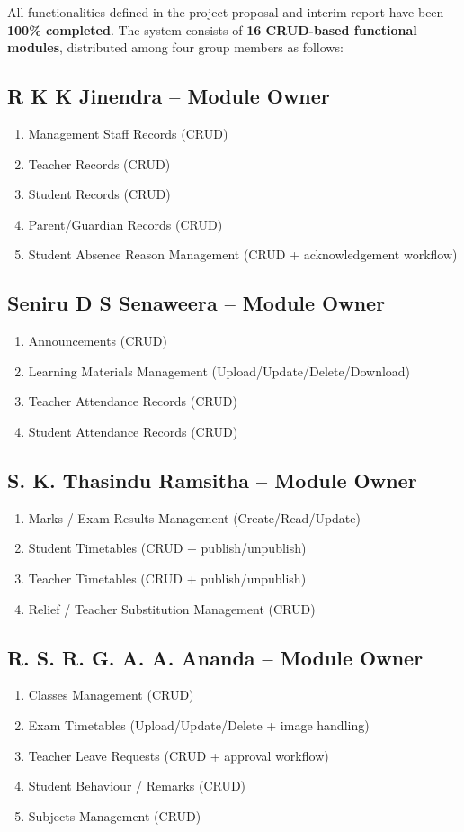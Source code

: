 \documentclass[12pt, a4paper]{report}
\begin{document}
All functionalities defined in the project proposal and interim report have been \textbf{100\% completed}. The system consists of \textbf{16 CRUD-based functional modules}, distributed among four group members as follows:

\subsection{R K K Jinendra -- Module Owner}
\begin{enumerate}
    \item Management Staff Records (CRUD)
    \item Teacher Records (CRUD)
    \item Student Records (CRUD)
    \item Parent/Guardian Records (CRUD)
    \item Student Absence Reason Management (CRUD + acknowledgement workflow)
\end{enumerate}

\subsection{Seniru D S Senaweera -- Module Owner}
\begin{enumerate}
    \item Announcements (CRUD)
    \item Learning Materials Management (Upload/Update/Delete/Download)
    \item Teacher Attendance Records (CRUD)
    \item Student Attendance Records (CRUD)
\end{enumerate}

\subsection{S. K. Thasindu Ramsitha -- Module Owner}
\begin{enumerate}
    \item Marks / Exam Results Management (Create/Read/Update)
    \item Student Timetables (CRUD + publish/unpublish)
    \item Teacher Timetables (CRUD + publish/unpublish)
    \item Relief / Teacher Substitution Management (CRUD)
\end{enumerate}

\subsection{R. S. R. G. A. A. Ananda -- Module Owner}
\begin{enumerate}
    \item Classes Management (CRUD)
    \item Exam Timetables (Upload/Update/Delete + image handling)
    \item Teacher Leave Requests (CRUD + approval workflow)
    \item Student Behaviour / Remarks (CRUD)
    \item Subjects Management (CRUD)
\end{enumerate}
\end{document}
